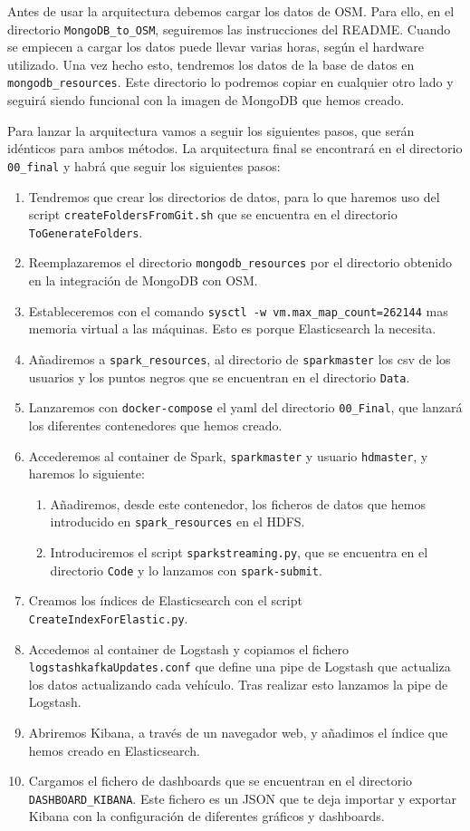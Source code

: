 Antes de usar la arquitectura debemos cargar los datos de OSM. Para ello, en el directorio {\tt MongoDB\_to\_OSM}, seguiremos las instrucciones del README. Cuando se empiecen a cargar los datos puede llevar varias horas, según el hardware utilizado. Una vez hecho esto, tendremos los datos de la base de datos en {\tt mongodb\_resources}. Este directorio lo podremos copiar en cualquier otro lado y seguirá siendo funcional con la imagen de MongoDB que hemos creado.

Para lanzar la arquitectura vamos a seguir los siguientes pasos, que serán idénticos para ambos métodos. La arquitectura final se encontrará en el directorio {\tt 00\_final} y habrá que seguir los siguientes pasos:

\begin{enumerate}
\item Tendremos que crear los directorios de datos, para lo que haremos uso del script {\tt createFoldersFromGit.sh} que se encuentra en el directorio {\tt ToGenerateFolders}.
\item Reemplazaremos el directorio {\tt mongodb\_resources} por el directorio obtenido en la integración de MongoDB con OSM.
\item Estableceremos con el comando {\tt sysctl -w vm.max\_map\_count=262144} mas memoria virtual a las máquinas. Esto es porque Elasticsearch la necesita.
\item Añadiremos a {\tt spark\_resources}, al directorio de {\tt sparkmaster}  los csv de los usuarios y los puntos negros que se encuentran en el directorio {\tt Data}.
\item Lanzaremos con {\tt docker-compose} el yaml del directorio {\tt 00\_Final}, que lanzará los diferentes contenedores que hemos creado.
\item Accederemos al container de Spark, {\tt sparkmaster} y usuario {\tt hdmaster}, y haremos lo siguiente:
\begin{enumerate}
\item Añadiremos, desde este contenedor, los ficheros de datos que hemos introducido en {\tt spark\_resources} en el HDFS.
\item Introduciremos el script {\tt sparkstreaming.py}, que se encuentra en el directorio {\tt Code} y lo lanzamos con {\tt spark-submit}.
\end{enumerate}
\item Creamos los índices de Elasticsearch con el script {\tt CreateIndexForElastic.py}.
\item Accedemos al container de Logstash y copiamos el fichero {\tt logstashkafkaUpdates.conf} que define una pipe de Logstash que actualiza los datos actualizando cada vehículo. Tras realizar esto lanzamos la pipe de Logstash.
\item Abriremos Kibana, a través de un navegador web, y añadimos el índice que hemos creado en Elasticsearch.
\item Cargamos el fichero de dashboards que se encuentran en el directorio {\tt DASHBOARD\_KIBANA}. Este fichero es un JSON que te deja importar y exportar Kibana con la configuración de diferentes gráficos y dashboards.
\end{enumerate}

